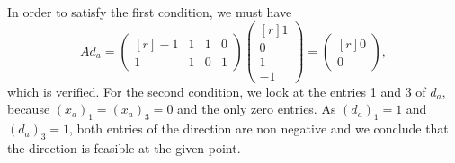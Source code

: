 \begin{enumerate}
        In order to satisfy the first condition, we must have
        \begin{equation*}
        Ad_a = \begin{pmatrix*}[r] -1 & 1 & 1 & 0 \\ 1 & 1 & 0 & 1 \end{pmatrix*} \begin{pmatrix*}[r] 1 \\ 0 \\ 1 \\ -1 \end{pmatrix*} = \begin{pmatrix*}[r] 0 \\ 0 \end{pmatrix*},
        \end{equation*}
        which is verified. For the second condition, we look
        at the entries 1 and 3 of $d_a$, because $(x_a)_1=(x_a)_3=0$
        and the only zero entries. As
        $(d_a)_1=1$ and $(d_a)_3=1$, both entries of the direction
        are non negative and we conclude that the direction is feasible
        at the given point. 
        

\end{enumerate}
